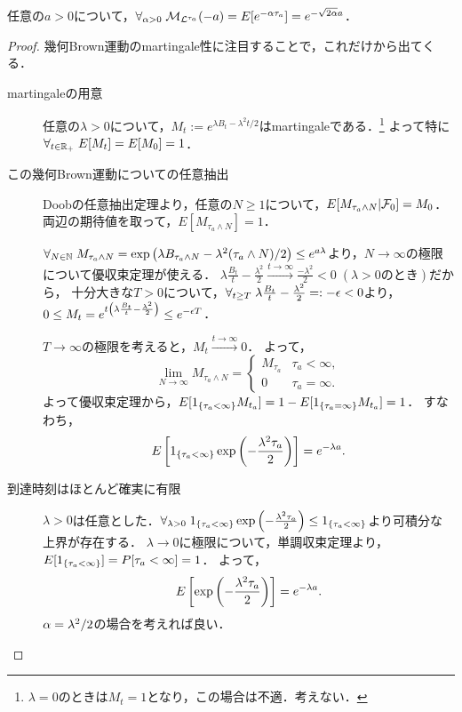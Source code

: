 \documentclass[uplatex,dvipdfmx]{jsreport}
\begin{document}
\begin{proposition}\label{prop-hitting-time}
    任意の$a>0$について，$\forall_{\alpha>0}\;\mathcal{M}_{\mathcal{L}^{\tau_a}}(-a)=E[e^{-\alpha\tau_a}]=e^{-\sqrt{2\alpha}a}$．
\end{proposition}
\begin{proof}
    幾何Brown運動のmartingale性に注目することで，これだけから出てくる．
    \begin{description}
        \item[martingaleの用意] 任意の$\lambda>0$について，$M_t:=e^{\lambda B_t-\lambda^2t/2}$はmartingaleである．\footnote{$\lambda=0$のときは$M_t=1$となり，この場合は不適．考えない．}
        よって特に$\forall_{t\in\mathbb{R}_+}\;E[M_t]=E[M_0]=1$．
        \item[この幾何Brown運動についての任意抽出]
        Doobの任意抽出定理より，任意の$N\ge 1$について，$E[M_{\tau_a\land N}|\mathcal{F}_0]=M_0$．両辺の期待値を取って，$E[M_{\tau_a\land N}]=1$．
        
        $\forall_{N\in\mathbb{N}}\;M_{\tau_a\land N}=\exp\left(\lambda B_{\tau_a\land N}-\lambda^2(\tau_a\land N)/2\right)\le e^{a\lambda}$より，$N\to\infty$の極限について優収束定理が使える．
        $\lambda\frac{B_t}{t}-\frac{\lambda^2}{2}\xrightarrow{t\to\infty}\frac{-\lambda^2}{2}<0\;(\lambda>0\text{のとき})$だから，
        十分大きな$T>0$について，$\forall_{t\ge T}\;\lambda\frac{B_t}{t}-\frac{\lambda^2}{2}=:-\epsilon<0$より，$0\le M_t=e^{t\left(\lambda\frac{B_t}{t}-\frac{\lambda^2}{2}\right)}\le e^{-\epsilon T}$．
        
        $T\to\infty$の極限を考えると，$M_t\xrightarrow{t\to\infty}0$．
        よって，
        \[\lim_{N\to\infty}M_{\tau_a\land N}=\begin{cases}
            M_{\tau_a}&\tau_a<\infty,\\
            0&\tau_a=\infty.
        \end{cases}\]
        よって優収束定理から，$E[1_{\left\{\tau_a<\infty\right\}}M_{t_a}]=1-E[1_{\left\{\tau_a=\infty\right\}}M_{t_a}]=1$．
        すなわち，
        \[E\left[1_{\left\{\tau_a<\infty\right\}}\exp\left(-\frac{\lambda^2\tau_a}{2}\right)\right]=e^{-\lambda a}.\]
        \item[到達時刻はほとんど確実に有限]
        $\lambda>0$は任意とした．$\forall_{\lambda>0}\;1_{\left\{\tau_a<\infty\right\}}\exp\left(-\frac{\lambda^2\tau_a}{2}\right)\le1_{\left\{\tau_a<\infty\right\}}$より可積分な上界が存在する．
        $\lambda\to0$に極限について，単調収束定理より，$E[1_{\left\{\tau_a<\infty\right\}}]=P[\tau_a<\infty]=1$．
        よって，
        \[E\left[\exp\left(-\frac{\lambda^2\tau_a}{2}\right)\right]=e^{-\lambda a}.\]
        $\alpha=\lambda^2/2$の場合を考えれば良い．
    \end{description}
\end{proof}
\end{document}
